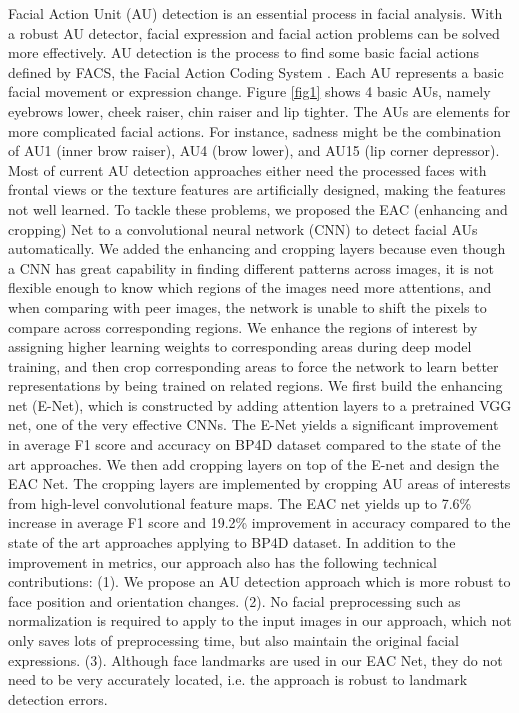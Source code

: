 \documentclass[a4paper, 10pt, conference]{ieeeconf}      %
\begin{document}
Facial Action Unit (AU) detection is an essential process in facial analysis. With a robust AU detector, facial expression and facial action problems can be solved more effectively. AU detection is the process to find some basic facial actions defined by FACS, the Facial Action Coding System \cite{p1}. Each AU represents a basic facial movement or expression change. Figure \ref{fig1} shows 4 basic AUs, namely eyebrows lower, cheek raiser, chin raiser and lip tighter.  The AUs are elements for more complicated facial actions. For instance, sadness might be the combination of AU1 (inner brow raiser), AU4 (brow lower), and AU15 (lip corner depressor). Most of current AU detection approaches either need the processed faces with frontal views or the texture features are artificially designed, making the features not well learned. To tackle these problems, we proposed the EAC (enhancing and cropping) Net to a convolutional neural network (CNN) to detect facial AUs automatically. { \color{black} We added the enhancing and cropping layers because even though a CNN has great capability in finding different patterns across images, it is not flexible enough to know which regions of the images need more attentions, and when comparing with peer images, the network is unable to shift the pixels to compare across corresponding regions. We enhance the regions of interest by assigning higher learning weights to corresponding areas during deep model training, and then crop corresponding areas to force the network to learn better representations by being trained on related regions.} We first build the enhancing net (E-Net), which is constructed by adding attention layers to a pretrained VGG net, one of the very effective CNNs. The E-Net yields a significant improvement in average F1 score and accuracy on BP4D dataset compared to the state of the art approaches. We then add cropping layers on top of the E-net and design the EAC Net. The cropping layers are implemented by cropping AU areas of interests from high-level convolutional feature maps. The EAC net yields up to 7.6\% increase in average F1 score and 19.2\% improvement in accuracy compared to the state of the art approaches applying to BP4D dataset. In addition to the improvement in metrics, our approach also has the following technical contributions: 
(1).	We propose an AU detection approach which is more robust to face position and orientation changes.
(2).	No facial preprocessing such as normalization is required to apply to the input images in our approach, which not only saves lots of preprocessing time, but also maintain the original facial expressions.
(3).	Although face landmarks are used in our EAC Net, they do not need to be very accurately located, i.e. the approach is robust to landmark detection errors.
\end{document}
